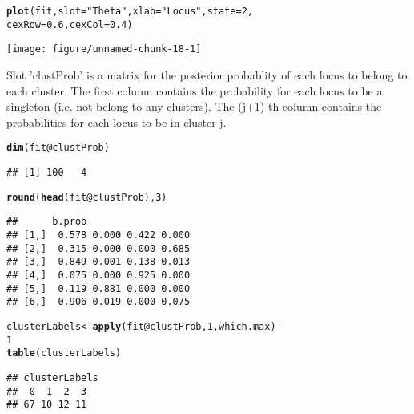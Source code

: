 \documentclass[a4paper,10pt]{article}\usepackage[]{graphicx}\usepackage[]{color}
\makeatletter
\def\maxwidth{ %
  \ifdim\Gin@nat@width>\linewidth
    \linewidth
  \else
    \Gin@nat@width
  \fi
}
\newcommand{\hlnum}[1]{\textcolor[rgb]{0.686,0.059,0.569}{#1}}%
\newcommand{\hlstr}[1]{\textcolor[rgb]{0.192,0.494,0.8}{#1}}%
\newcommand{\hlopt}[1]{\textcolor[rgb]{0,0,0}{#1}}%
\newcommand{\hlstd}[1]{\textcolor[rgb]{0.345,0.345,0.345}{#1}}%
\newcommand{\hlkwb}[1]{\textcolor[rgb]{0.69,0.353,0.396}{#1}}%
\newcommand{\hlkwc}[1]{\textcolor[rgb]{0.333,0.667,0.333}{#1}}%
\newcommand{\hlkwd}[1]{\textcolor[rgb]{0.737,0.353,0.396}{\textbf{#1}}}%
\newenvironment{kframe}{%
 \def\at@end@of@kframe{}%
 \ifinner\ifhmode%
  \def\at@end@of@kframe{\end{minipage}}%
  \begin{minipage}{\columnwidth}%
 \fi\fi%
 \def\FrameCommand##1{\hskip\@totalleftmargin \hskip-\fboxsep
 \colorbox{shadecolor}{##1}\hskip-\fboxsep
     \hskip-\linewidth \hskip-\@totalleftmargin \hskip\columnwidth}%
 \MakeFramed {\advance\hsize-\width
   \@totalleftmargin\z@ \linewidth\hsize
   \@setminipage}}%
 {\par\unskip\endMakeFramed%
 \at@end@of@kframe}
\newenvironment{knitrout}{}{} %
\makeatother
\begin{document}
\begin{knitrout}
\color{fgcolor}\begin{kframe}
\begin{alltt}
\hlkwd{plot}\hlstd{(fit,} \hlkwc{slot} \hlstd{=} \hlstr{"Theta"}\hlstd{,} \hlkwc{xlab} \hlstd{=} \hlstr{"Locus"}\hlstd{,} \hlkwc{state} \hlstd{=} \hlnum{2}\hlstd{,}
    \hlkwc{cexRow} \hlstd{=} \hlnum{0.6}\hlstd{,} \hlkwc{cexCol} \hlstd{=} \hlnum{0.4}\hlstd{)}
\end{alltt}
\end{kframe}

{\centering \texttt{[image: figure/unnamed-chunk-18-1]} 

}



\end{knitrout}

Slot 'clustProb' is a matrix for the posterior probablity of each locus to belong to each cluster. The first column contains the probability for each locus to be a singleton (i.e. not belong to any clusters). The (j+1)-th column contains the probabilities for each locus to be in cluster j.

\begin{knitrout}
\color{fgcolor}\begin{kframe}
\begin{alltt}
\hlkwd{dim}\hlstd{(fit}\hlopt{@}\hlkwc{clustProb}\hlstd{)}
\end{alltt}
\begin{verbatim}
## [1] 100   4
\end{verbatim}
\begin{alltt}
\hlkwd{round}\hlstd{(}\hlkwd{head}\hlstd{(fit}\hlopt{@}\hlkwc{clustProb}\hlstd{),} \hlnum{3}\hlstd{)}
\end{alltt}
\begin{verbatim}
##      b.prob                  
## [1,]  0.578 0.000 0.422 0.000
## [2,]  0.315 0.000 0.000 0.685
## [3,]  0.849 0.001 0.138 0.013
## [4,]  0.075 0.000 0.925 0.000
## [5,]  0.119 0.881 0.000 0.000
## [6,]  0.906 0.019 0.000 0.075
\end{verbatim}
\begin{alltt}
\hlstd{clusterLabels} \hlkwb{<-} \hlkwd{apply}\hlstd{(fit}\hlopt{@}\hlkwc{clustProb}\hlstd{,} \hlnum{1}\hlstd{, which.max)} \hlopt{-}
    \hlnum{1}
\hlkwd{table}\hlstd{(clusterLabels)}
\end{alltt}
\begin{verbatim}
## clusterLabels
##  0  1  2  3 
## 67 10 12 11
\end{verbatim}
\end{kframe}
\end{knitrout}
\end{document}
